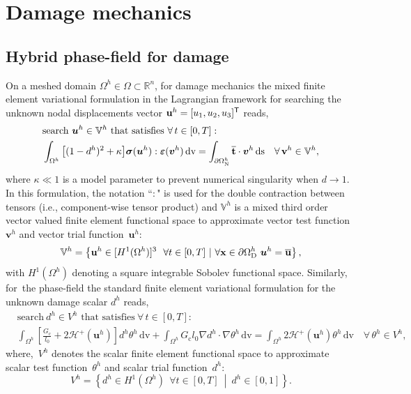\documentclass{report}
\newcommand{\bx}{\textbf{x}}
\newcommand{\bu}{\textbf{u}}
\newcommand{\bv}{\textbf{v}}
\newcommand{\bt}{\boldsymbol t}
\newcommand{\bgc}{G_{\text{c}}}
\newcommand{\buh}{\boldsymbol u^h}
\newcommand{\bvh}{\boldsymbol v^h}
\newcommand{\fih}{ d^h}
\newcommand{\ttah}{ \theta^h}
\newcommand{\sig}{\boldsymbol{\sigma}}
\newcommand{\eps}{\boldsymbol{\varepsilon}}
\newcommand{\dv}{\mathrm{d}\text{v}}
\newcommand{\ds}{\mathrm{d}\text{s}}
\def\bx{{\bf{x}}}
\def\bt{{\bf t}}
\def\bu{{\bf{u}}}
\def\bv{{\bf{v}}}
\begin{document}
\section{Damage mechanics}
\subsection{Hybrid phase-field for damage}
On a meshed domain $\Omega^h\in\Omega\subset\mathbb{R}^n$, for damage mechanics the mixed finite element variational formulation in the Lagrangian framework for searching the unknown nodal displacements vector $\bu^h=[u_1,u_2,u_3]^\mathsf{T}$ reads,
%
%
\begin{equation}\label{Eq:VarfU}
\begin{aligned}
&\text{search}~\buh\in\mathbb{V}^h \text{~that satisfies}~\forall\, t\in[0,T]:\\
&\int_{\Omega^h}\big[(1-d^h)^2 + \kappa \big]\sig(\buh) : \eps(\bvh) \,\dv= \int_{\partial\Omega^h_\text{N}} \overline{\bt}\cdot\bvh \,\ds \quad\forall\,\bv^h\in\mathbb{V}^h,
\end{aligned}
\end{equation}
where $\kappa\ll1$ is a model parameter to prevent numerical singularity when $d \to 1$.
In this formulation, the notation ``$:$" is used for the double contraction between tensors (i.e., component-wise tensor product) and $ \mathbb{V}^h $ is a  mixed third order vector valued finite element functional space to approximate vector test function~$\bvh$ and vector trial function~$\buh$:
\begin{equation}
\mathbb{V}^h=\left\{ \bu^h\in [ {H}^1(\Omega^h) ]^3~~\forall t\in[0,T]~|~ \forall \bx\in\partial\Omega^h_{\text{D}}~\buh=\overline{\bu}\right\},
\end{equation}
%
with ${H}^1(\Omega^h)$ denoting a square integrable Sobolev functional space.
Similarly, for~the phase-field the standard finite element variational formulation for the unknown damage scalar $\fih$ reads, 
%
%
\begin{equation}
\begin{aligned}\label{Eq:VarfPhi}
&\text{search}~\fih\in{{V}}^h \text{~that satisfies}~\forall\, t\in[0,T]:\\
&\int_{\Omega^h}\left[ \frac{\bgc}{l_0} + 2 \mathcal{H}^{+}(\buh) \right]\fih\ttah\, \dv + \int_{\Omega^h} {\bgc}{l_0}\nabla\fih \cdot \nabla\ttah \, \dv= \int_{\Omega^h} 2\mathcal{H}^{+}(\buh)\ttah \, \dv\quad\forall\,\ttah\in{{V}}^h, 
\end{aligned}
\end{equation}
%
%
where,~${{V}}^h$ denotes the scalar finite element functional space to approximate scalar test function~$\ttah$ and scalar trial function~$\fih$:
\begin{equation}
{{V}}^h=\left\{\fih \in  {H}^1(\Omega^h)~~\forall t\in[0,T]~\middle|~\fih\in[0,1]  \right\}.
\end{equation}
\end{document}
